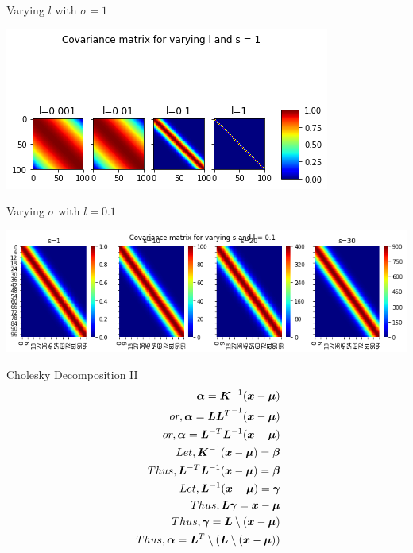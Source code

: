 \documentclass{beamer}
\begin{document}
\begin{frame}{Varying $l$ with $\sigma = 1$}
	\begin{center}
		\includegraphics[width=\linewidth, height=\textheight -120pt ,keepaspectratio]{gp/vary_l}
	\end{center}
	
\end{frame}

\begin{frame}{Varying $\sigma$ with $l = 0.1$}
	\begin{center}
		\includegraphics[width=\linewidth, height=\textheight -120pt ,keepaspectratio]{gp/vary_s}
	\end{center}
	
\end{frame}

\begin{frame}{Cholesky Decomposition II}
\begin{align*}
\bm{\alpha} = \bm{K}^{-1}(\bm{x}-\bm{\mu}) \\
or, \bm{\alpha} = {\bm{LL}^T}^{-1}(\bm{x}-\bm{\mu}) \\
or, \bm{\alpha} = \bm{L}^{-T}\bm{L}^{-1}(\bm{x}-\bm{\mu}) \\
Let, \bm{K}^{-1}(\bm{x}-\bm{\mu}) = \bm{\beta} \\
Thus, \bm{L}^{-T}\bm{L}^{-1}(\bm{x}-\bm{\mu}) = \bm{\beta} \\
Let, \bm{L}^{-1}(\bm{x}-\bm{\mu}) = \bm{\gamma}\\
Thus, \bm{L}\bm{\gamma} = \bm{x}-\bm{\mu} \\
Thus, \bm{\gamma} = \bm{L} \setminus (\bm{x}-\bm{\mu})\\\
Thus, \bm{\alpha} = \bm{L}^{T} \setminus (\bm{L} \setminus (\bm{x}-\bm{\mu}))
\end{align*}

\end{frame}
\end{document}
